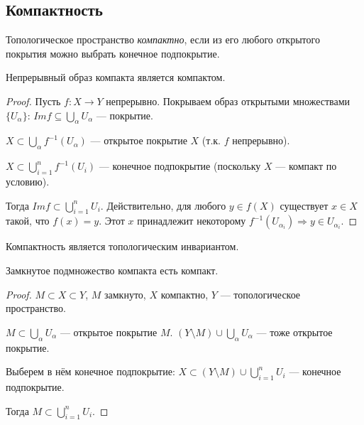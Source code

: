 \subsection{Компактность}
\begin{definition}
    Топологическое пространство \textit{компактно}, если из его любого открытого покрытия можно выбрать конечное подпокрытие.
\end{definition}

\begin{statement}
    Непрерывный образ компакта является компактом.
\end{statement}
\begin{proof}
    Пусть $f: X \to Y$ непрерывно. Покрываем образ открытыми множествами $\{U_{\alpha}\}$: $Im f \subseteq \bigcup\limits_{\alpha} U_{\alpha}$ — покрытие.

    $X \subset \bigcup\limits_{\alpha} f^{-1}(U_{\alpha})$ — открытое покрытие $X$ (т.к. $f$ непрерывно).

    $X \subset \bigcup\limits_{i = 1}^{n} f^{-1}(U_{i})$ — конечное подпокрытие (поскольку $X$ — компакт по условию).

    Тогда $Im f \subset \bigcup\limits_{i = 1}^n U_{i}$. Действительно, для любого $y \in f(X)$ существует $x \in X$ такой, что $f(x) = y$. Этот $x$ принадлежит некоторому $f^{-1}(U_{\alpha_i}) \Longrightarrow y \in U_{\alpha_i}$.
\end{proof}

\begin{remark}
    Компактность является топологическим инвариантом.
\end{remark}

\begin{statement}
    Замкнутое подмножество компакта есть компакт.
\end{statement}
\begin{proof}
    $M \subset X \subset Y$, $M$ замкнуто, $X$ компактно, $Y$ — топологическое пространство.

    $M \subset \bigcup\limits_{\alpha} U_{\alpha}$ — открытое покрытие $M$.
    $(Y \setminus M) \cup \bigcup\limits_{\alpha} U_{\alpha}$ — тоже открытое покрытие.

    Выберем в нём конечное подпокрытие:
    $X \subset (Y \setminus M) \cup \bigcup\limits_{i = 1}^n U_i$ — конечное подпокрытие.

    Тогда $M \subset \bigcup\limits_{i = 1}^n U_i$.
\end{proof}


